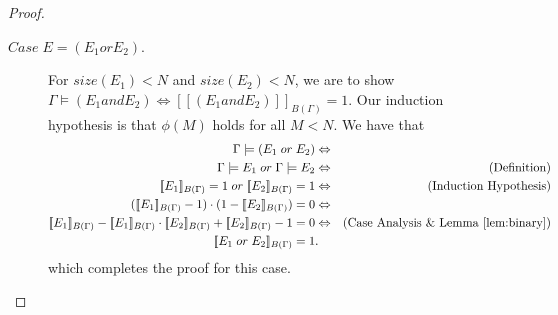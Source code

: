 \documentclass[acmsmall, review, anonymous]{acmart}\settopmatter{printfolios=true,printccs=false,printacmref=false}
\newcommand{\qqpi}[2]{[\![#2]\!]_{#1}}
\begin{document}
\begin{proof}
\begin{description}
            \item[$Case \; E = (E_1 \mathrel{or} E_2)$.]
                  For $size(E_1) < N$ and $size(E_2) < N$, we are to show
                  $\Gamma \models (E_1 \mathrel{and} E_2) \Leftrightarrow \qqpi{B(\Gamma)}{(E_1 \mathrel{and} E_2)} = 1$. Our induction hypothesis is that $\phi(M)$ holds for all $M<N$. We have that
                  \begin{align*}
                      \Gamma \models (E_1 \mathrel{or} E_2)                                                                     & \Leftrightarrow & \\
                      \Gamma \models E_1 \mathrel{or} \Gamma \models E_2                                                        & \Leftrightarrow &\text{(Definition)} \\
                      \qqpi{B(\Gamma)}{E_1} = 1 \mathrel{or} \qqpi{B(\Gamma)}{E_2} = 1                                          & \Leftrightarrow & \text{(Induction Hypothesis)}                                  \\
                      (\qqpi{B(\Gamma)}{E_1} - 1) \cdot (1- \qqpi{B(\Gamma)}{E_2}) = 0                                          & \Leftrightarrow                                  \\
                      \qqpi{B(\Gamma)}{E_1} - \qqpi{B(\Gamma)}{E_1} \cdot \qqpi{B(\Gamma)}{E_2} + \qqpi{B(\Gamma)}{E_2} - 1 = 0 & \Leftrightarrow                         &\text{(Case Analysis \& Lemma~\ref{lem:binary})}         \\
                      \qqpi{B(\Gamma)}{E_1 \mathrel{or} E_2} = 1                                                               &. 
                  \end{align*}
                  which completes the proof for this case.
    \end{description}
\end{proof}




\end{document}
